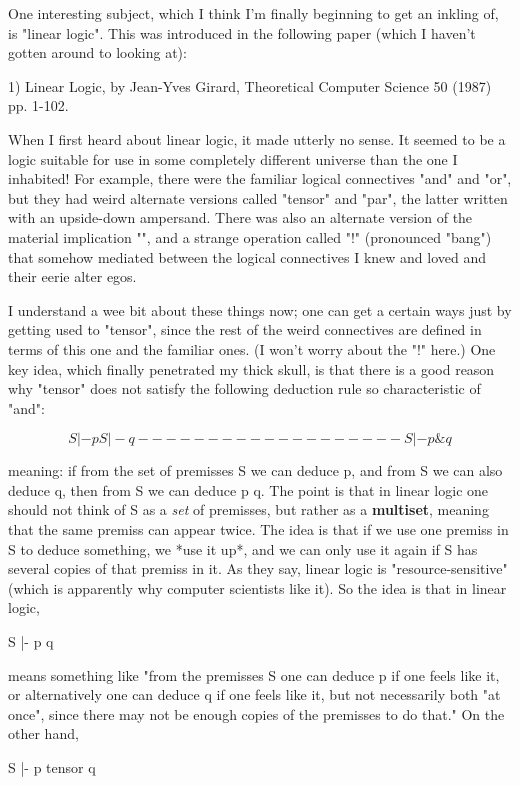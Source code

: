 One interesting subject, which I think I'm finally beginning to get an
inkling of, is "linear logic".  This was introduced in the following
paper (which I haven't gotten around to looking at):

1) Linear Logic, by Jean-Yves Girard, Theoretical Computer Science 50
(1987) pp. 1-102.

When I first heard about linear logic, it made utterly no sense.  It
seemed to be a logic suitable for use in some completely different
universe than the one I inhabited!  For example, there were the familiar
logical connectives "and" and "or", but they had weird alternate
versions called "tensor" and "par", the latter written with an
upside-down ampersand.  There was also an alternate version of 
the material implication "\to ", and a strange operation called "!"
(pronounced "bang") that somehow mediated between the logical
connectives I knew and loved and their eerie alter egos. 

I understand a wee bit about these things now; one can get a certain
ways just by getting used to "tensor", since the rest of the weird
connectives are defined in terms of this one and the familiar ones.
(I won't worry about the "!" here.)  One key idea, which finally
penetrated my thick skull, is that there is a good reason why "tensor"
does not satisfy the following deduction rule so characteristic of "and": 

$$
S |- p       S |- q
-------------------
S |- p \text{\&}  q
$$
    

meaning: if from the set of premisses S we can deduce p, and from S we
can also deduce q, then from S we can deduce p\text{\&} q.  The point is that in
linear logic one should not think of S as a \emph{set} of premisses, but
rather as a \textbf{multiset}, meaning that the same premiss can appear twice.
The idea is that if we use one premiss in S to deduce something, we *use
it up*, and we can only use it again if S has several copies of that
premiss in it.  As they say, linear logic is "resource-sensitive" (which
is apparently why computer scientists like it).  So the idea is that in
linear logic,

S |- p\text{\&} q

means something like "from the premisses S one can deduce p if one feels
like it, or alternatively one can deduce q if one feels like it, but not
necessarily both "at once", since there may not be enough copies of the
premisses to do that."   On the other hand, 

S |- p tensor q

